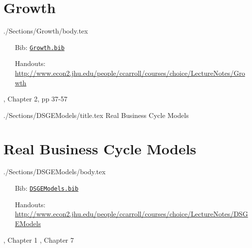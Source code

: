 \documentclass{\econtex}
\begin{document}
\section{Growth}\label{sec:Growth}

\begin{verbatimwrite}{./Sections/Growth/body.tex}

\providecommand{\blf}{\cite{blanchard&fischer:text}}
\providecommand{\ro}{\cite{romer:text}}
\begin{itemize}
\item[Bib:] \texttt{\href{http://www.econ2.jhu.edu/people/ccarroll/courses/Choice/Syllabus/Growth.bib}{Growth.bib}}
\item[Handouts:]  \url{http://www.econ2.jhu.edu/people/ccarroll/courses/choice/LectureNotes/Growth}
\end{itemize}
\bi
\reqd \blf, Chapter 2, pp 37-57
\reqd \cite{salaimartin:lecnotes}
\recm \cite{king&rebelo:trans}
\recm \cite{phelps:golden}
\ei

\end{verbatimwrite}



\ifPost
{} 
\fi

\begin{verbatimwrite}{./Sections/DSGEModels/title.tex}
Real Business Cycle Models
\end{verbatimwrite}

\section{Real Business Cycle Models}
\begin{verbatimwrite}{./Sections/DSGEModels/body.tex}
\begin{itemize}
\item[Bib:] \texttt{\href{http://www.econ2.jhu.edu/people/ccarroll/courses/Choice/Syllabus/DSGEModels.bib}{DSGEModels.bib}}
\item[Handouts:]  \url{http://www.econ2.jhu.edu/people/ccarroll/courses/choice/LectureNotes/DSGEModels}
\end{itemize}

\providecommand{\blf}{\cite{blanchard&fischer:text}}
\providecommand{\ro}{\cite{romer:text}}
\bi
\reqd \blf, Chapter 1
\reqd \blf, Chapter 7
\reqd \cite{prescottTheoryAhead}
\reqd \cite{summers:skeptical}
\ei

\end{verbatimwrite}
\end{document}
